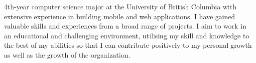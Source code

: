 

\begin{cvparagraph}

4th-year computer science major at the University of British Columbia with extensive experience in building mobile and web applications.
I have gained valuable skills and experiences from a broad range of projects. I aim to work in an educational and challenging environment, utilising my skill and knowledge to the best of my abilities so that I can contribute positively to my personal growth as well as the growth of the organization.
\end{cvparagraph}
\vspace{-3ex}
